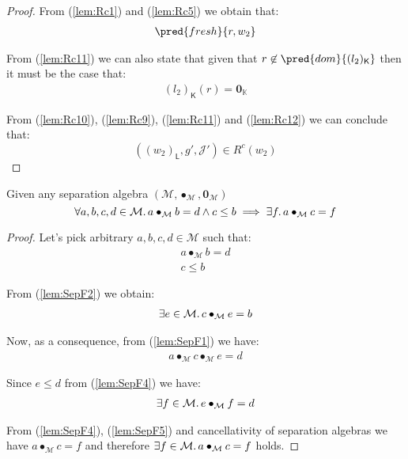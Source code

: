 {\begin{proof}
From (\ref{lem:Rc1}) and (\ref{lem:Rc5}) we obtain that:
\begin{gather}
	\label{lem:Rc11} \pred{fresh}{r, w_2}
\end{gather}

From (\ref{lem:Rc11}) we can also state that given that $r \not\in \pred{dom}{(l_2)_\mathsf{K}}$ then it must be the case that:
\begin{gather}
	\label{lem:Rc12} (l_2)_\mathsf{K}(r) = \mathbf{0}_\mathbb{K}
\end{gather}

From (\ref{lem:Rc10}), (\ref{lem:Rc9}), (\ref{lem:Rc11}) and (\ref{lem:Rc12}) we can conclude that:
\[
	((w_2)_\mathsf{L}, g', \mathcal{J}') \in R^c(w_2)
\]
\end{proof}
}

\lem \label{lem:SepF} Given any separation algebra $(\mathcal{M}, \bullet_\mathcal{M}, \mathbf{0}_\mathcal{M})$
\[
	\forall a, b, c, d \in \mathcal{M} \ldotp a \bullet_\mathcal{M} b = d \land c \leq b \implies \exists f \ldotp a \bullet_\mathcal{M} c = f
\]

{\parindent0pt
\begin{proof}
Let's pick arbitrary $a, b, c, d \in \mathcal{M}$ such that:
\begin{gather}
	\label{lem:SepF1} a \bullet_\mathcal{M} b = d
	\\
	\label{lem:SepF2} c \leq b
\end{gather}

From (\ref{lem:SepF2}) we obtain:
\begin{gather}
	\label{lem:SepF3} \exists e \in \mathcal{M} \ldotp c \bullet_\mathcal{M} e = b
\end{gather}

Now, as a consequence, from (\ref{lem:SepF1}) we have:
\begin{gather}
	\label{lem:SepF4} a \bullet_\mathcal{M} c \bullet_\mathcal{M} e = d
\end{gather}

Since $e \leq d$ from (\ref{lem:SepF4}) we have:
\begin{gather}
	\label{lem:SepF5} \exists f \in \mathcal{M} \ldotp e \bullet_\mathcal{M} f = d
\end{gather}

From (\ref{lem:SepF4}), (\ref{lem:SepF5}) and cancellativity of separation algebras we have $a \bullet_\mathcal{M} c = f$ and therefore $\exists f \in \mathcal{M} \ldotp a \bullet_\mathcal{M} c = f$ holds.
\end{proof}
}